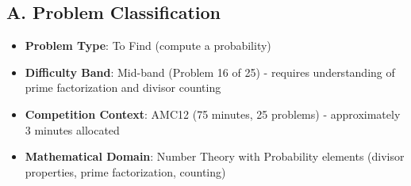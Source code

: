 \documentclass[]{article}
\begin{document}
\begin{problemconfigbox}
\subsection*{A. Problem Classification}
\begin{itemize}[leftmargin=*]
    \item \textbf{Problem Type}: To Find (compute a probability)
    \item \textbf{Difficulty Band}: Mid-band (Problem 16 of 25) - requires understanding of prime factorization and divisor counting
    \item \textbf{Competition Context}: AMC12 (75 minutes, 25 problems) - approximately 3 minutes allocated
    \item \textbf{Mathematical Domain}: Number Theory with Probability elements (divisor properties, prime factorization, counting)
\end{itemize}


\end{problemconfigbox}
\end{document}
